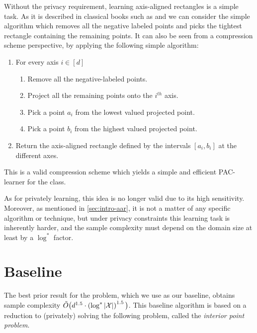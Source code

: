 \documentclass[12pt,a4paper,oneside,onecolumn]{book}
\begin{document}
Without the privacy requirement, learning axis-aligned rectangles is a simple task. As it is described in classical books such as \citet{Kearns97} and \citet{shalev-shwartz_understanding_2014} we can consider the simple algorithm which removes all the negative labeled points and picks the tightest rectangle containing the remaining points. 
It can also be seen from a compression scheme perspective, by applying the following simple algorithm:
\begin{enumerate}[leftmargin=15pt]
    \item For every axis $i\in [d]$
    \begin{enumerate}
        \item Remove all the negative-labeled points.
        \item Project all the remaining points onto the $i^{th}$ axis.
        \item Pick a point $a_i$ from the lowest valued projected point.
        \item Pick a point $b_i$ from the highest valued projected point.
    \end{enumerate}
    \item Return the axis-aligned rectangle defined by the intervals $[a_i,b_i]$ at the different axes.
\end{enumerate}
This is a valid compression scheme which yields a simple and efficient PAC-learner for the class.

As for privately learning, this idea is no longer valid due to its high sensitivity. Moreover, as mentioned in \ref{sec:intro-aar}, it is not a matter of any specific algorithm or technique, but under privacy constraints this learning task is inherently harder, and the sample complexity must depend on the domain size at least by a $\log^*$ factor.

\section{Baseline}
\label{sec:litrature-plaar}

The best prior result for the problem, which we use as our baseline, obtains sample complexity $\tilde{O}\big( d^{1.5} \cdot \left( \log^*|\mathcal{X}|\right)^{1.5} \big)$.
This baseline algorithm is based on a reduction to (privately) solving the following problem, called the {\em interior point problem}.
\end{document}
